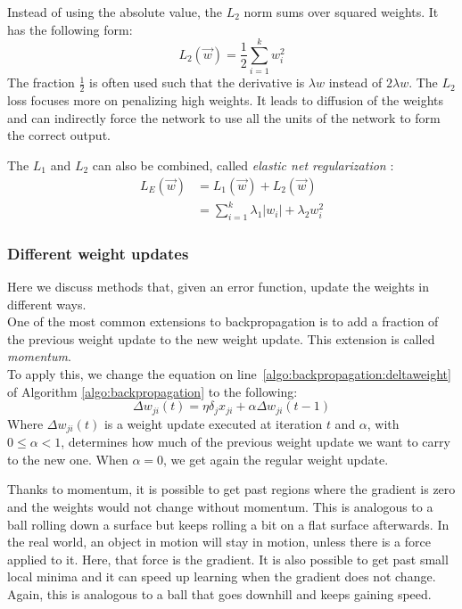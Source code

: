 Instead of using the absolute value, the $L_2$ norm sums over squared weights. It has the following form:
\begin{equation}
    L_2(\overrightarrow{w}) = \frac{1}{2} \sum_{i=1}^k w_i^2
\end{equation}
The fraction $\frac{1}{2}$ is often used such that the derivative is $\lambda w$ instead of $2 \lambda w$. The $L_2$ loss focuses more on penalizing high weights. It leads to diffusion of the weights and can indirectly force the network to use all the units of the network to form the correct output.

The $L_1$ and $L_2$ can also be combined, called \textit{elastic net regularization} \parencite{hastie2012ElasticNet}:
\begin{align}
    L_E (\overrightarrow{w}) &= L_1(\overrightarrow{w}) + L_2(\overrightarrow{w})\\
    &= \sum_{i=1}^k \lambda_1 \vert w_i \vert + \lambda_2 w_i^2
\end{align}


\subsubsection{Different weight updates} %
\label{ssub:different_weight_updates}
Here we discuss methods that, given an error function, update the weights in different ways.\\

One of the most common extensions to backpropagation is to add a fraction of the previous weight update to the new weight update. This extension is called \textit{momentum}.\\
To apply this, we change the equation on line~\ref{algo:backpropagation:deltaweight} of Algorithm \ref{algo:backpropagation} to the following:
\begin{equation}
    \Delta w_{ji}(t) = \eta \delta_j x_{ji} + \alpha \Delta w_{ji}(t-1)
\end{equation}
Where $\Delta w_{ji}(t)$ is a weight update executed at iteration $t$ and $\alpha$, with $0 \le \alpha < 1$, determines how much of the previous weight update we want to carry to the new one. When $\alpha = 0$, we get again the regular weight update.

Thanks to momentum, it is possible to get past regions where the gradient is zero and the weights would not change without momentum.
This is analogous to a ball rolling down a surface but keeps rolling a bit on a flat surface afterwards. In the real world, an object in motion will stay in motion, unless there is a force applied to it.
Here, that force is the gradient. It is also possible to get past small local minima and it can speed up learning when the gradient does not change. Again, this is analogous to a ball that goes downhill and keeps gaining speed.\\

